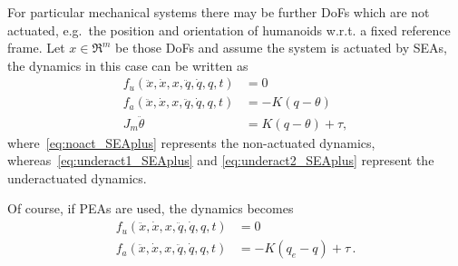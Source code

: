 For particular mechanical systems there may be further DoFs which are not actuated, e.g.~the position and orientation of humanoids w.r.t. a fixed reference frame. Let $x\in\Re^m$ be those DoFs and assume the system is actuated by SEAs, the dynamics in this case can be written as 
\begin{align}
\label{eq:noact_SEAplus}
f_u(\ddot x, \dot x, x, \ddot{q}, \dot{q}, q, t) &= 0  \\
\label{eq:underact1_SEAplus}
f_a(\ddot x, \dot x, x, \ddot{q}, \dot{q}, q, t) &= - K(q - \theta)  \\
J_{m} \ddot{\theta} &= K(q - \theta)+\tau,
\label{eq:underact2_SEAplus}
\end{align}
where~\eqref{eq:noact_SEAplus} represents the non-actuated dynamics, whereas~\eqref{eq:underact1_SEAplus} and \eqref{eq:underact2_SEAplus} represent the underactuated dynamics.

Of course, if PEAs are used, the dynamics becomes
\begin{align}
\label{eq:noact_PEAplus}
f_u(\ddot x, \dot x, x, \ddot{q}, \dot{q}, q, t) &= 0  \\
\label{eq:underact_PEAplus}
f_a(\ddot x, \dot x, x, \ddot{q}, \dot{q}, q, t) &= - K(q_e - q)+\tau\,.
\end{align}
% 
% 

